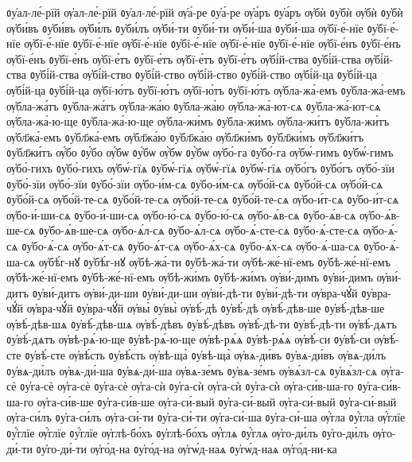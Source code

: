 {ᲂу҆ал-ле́-рїй
ѹ҆ал-ле́-рїй
ᲂу҆ал-ле́-рїй
ѹ҆а́-ре
ᲂу҆а́-ре
ѹ҆а́ръ
ᲂу҆а́ръ
ѹ҆бѝ
ᲂу҆бѝ
ѹ҆бѝ
ᲂу҆бѝ
ѹ҆би́въ
ᲂу҆би́въ
ѹ҆би́лъ
ᲂу҆би́лъ
ѹ҆би́-ти
ᲂу҆би́-ти
ѹ҆би́-ша
ᲂу҆би́-ша
ѹ҆бї-е́-нїе
ᲂу҆бї-е́-нїе
ѹ҆бї-е́-нїе
ᲂу҆бї-е́-нїе
ѹ҆бї-е́-нїе
ᲂу҆бї-е́-нїе
ѹ҆бї-е́-нїе
ᲂу҆бї-е́-нїе
ѹ҆бї-е́нъ
ᲂу҆бї-е́нъ
ѹ҆бї-е́нъ
ᲂу҆бї-е́нъ
ѹ҆бї-е́тъ
ᲂу҆бї-е́тъ
ѹ҆бї-е́тъ
ᲂу҆бї-е́тъ
ѹ҆бі́й-ства
ᲂу҆бі́й-ства
ѹ҆бі́й-ства
ᲂу҆бі́й-ства
ѹ҆бі́й-ство
ᲂу҆бі́й-ство
ѹ҆бі́й-ство
ᲂу҆бі́й-ство
ѹ҆бі́й-ца
ᲂу҆бі́й-ца
ѹ҆бі́й-ца
ᲂу҆бі́й-ца
ѹ҆бї-ю́тъ
ᲂу҆бї-ю́тъ
ѹ҆бї-ю́тъ
ᲂу҆бї-ю́тъ
ѹ҆бла-жа́-емъ
ᲂу҆бла-жа́-емъ
ѹ҆бла-жа́тъ
ᲂу҆бла-жа́тъ
ѹ҆бла-жа́ю
ᲂу҆бла-жа́ю
ѹ҆бла-жа́-ют-сѧ
ᲂу҆бла-жа́-ют-сѧ
ѹ҆бла-жа́-ю-ще
ᲂу҆бла-жа́-ю-ще
ѹ҆бла-жи́мъ
ᲂу҆бла-жи́мъ
ѹ҆бла-жи́тъ
ᲂу҆бла-жи́тъ
ѹ҆бл҃жа́-емъ
ᲂу҆бл҃жа́-емъ
ѹ҆бл҃жа́ю
ᲂу҆бл҃жа́ю
ѹ҆бл҃жи́мъ
ᲂу҆бл҃жи́мъ
ѹ҆бл҃жи́тъ
ᲂу҆бл҃жи́тъ
ѹ҆́бо
ᲂу҆́бо
ѹ҆́бѡ
ᲂу҆́бѡ
ѹ҆̀бѡ
ᲂу҆̀бѡ
ѹ҆бо́-га
ᲂу҆бо́-га
ѹ҆бѡ́-гимъ
ᲂу҆бѡ́-гимъ
ѹ҆бо́-гихъ
ᲂу҆бо́-гихъ
ѹ҆бѡ́-гїѧ
ᲂу҆бѡ́-гїѧ
ѹ҆бѡ́-гїѧ
ᲂу҆бѡ́-гїѧ
ѹ҆бо́гъ
ᲂу҆бо́гъ
ѹ҆бо́-зїи
ᲂу҆бо́-зїи
ѹ҆бо́-зїи
ᲂу҆бо́-зїи
ѹ҆бо-и́м-сѧ
ᲂу҆бо-и́м-сѧ
ѹ҆бо́й-сѧ
ᲂу҆бо́й-сѧ
ѹ҆бо́й-сѧ
ᲂу҆бо́й-сѧ
ѹ҆бо́й-те-сѧ
ᲂу҆бо́й-те-сѧ
ѹ҆бо́й-те-сѧ
ᲂу҆бо́й-те-сѧ
ѹ҆бо-и́т-сѧ
ᲂу҆бо-и́т-сѧ
ѹ҆бо-и́-ши-сѧ
ᲂу҆бо-и́-ши-сѧ
ѹ҆бо-ю́-сѧ
ᲂу҆бо-ю́-сѧ
ѹ҆бо-ѧ́в-сѧ
ᲂу҆бо-ѧ́в-сѧ
ѹ҆бо-ѧ́в-ше-сѧ
ᲂу҆бо-ѧ́в-ше-сѧ
ѹ҆бо-ѧ́л-сѧ
ᲂу҆бо-ѧ́л-сѧ
ѹ҆бо-ѧ́-сте-сѧ
ᲂу҆бо-ѧ́-сте-сѧ
ѹ҆бо-ѧ́-сѧ
ᲂу҆бо-ѧ́-сѧ
ѹ҆бо-ѧ́т-сѧ
ᲂу҆бо-ѧ́т-сѧ
ѹ҆бо-ѧ́х-сѧ
ᲂу҆бо-ѧ́х-сѧ
ѹ҆бо-ѧ́-ша-сѧ
ᲂу҆бо-ѧ́-ша-сѧ
ѹ҆бѣ́г-нꙋ
ᲂу҆бѣ́г-нꙋ
ѹ҆бѣ-жа́-ти
ᲂу҆бѣ-жа́-ти
ѹ҆бѣ-же́-нї-емъ
ᲂу҆бѣ-же́-нї-емъ
ѹ҆бѣ-же́-нї-емъ
ᲂу҆бѣ-же́-нї-емъ
ѹ҆бѣ-жи́мъ
ᲂу҆бѣ-жи́мъ
ѹ҆ви́-димъ
ᲂу҆ви́-димъ
ѹ҆ви́-дитъ
ᲂу҆ви́-дитъ
ѹ҆ви́-ди-ши
ᲂу҆ви́-ди-ши
ѹ҆ви́-дѣ-ти
ᲂу҆ви́-дѣ-ти
ѹ҆вра-чꙋ́й
ᲂу҆вра-чꙋ́й
ѹ҆вра-чꙋ́й
ᲂу҆вра-чꙋ́й
ѹ҆вы̀
ᲂу҆вы̀
ѹ҆вѣ́-дѣ
ᲂу҆вѣ́-дѣ
ѹ҆вѣ́-дѣв-ше
ᲂу҆вѣ́-дѣв-ше
ѹ҆вѣ́-дѣв-шѧ
ᲂу҆вѣ́-дѣв-шѧ
ѹ҆вѣ́-дѣвъ
ᲂу҆вѣ́-дѣвъ
ѹ҆вѣ́-дѣ-ти
ᲂу҆вѣ́-дѣ-ти
ѹ҆вѣ́-дѧтъ
ᲂу҆вѣ́-дѧтъ
ѹ҆вѣ-рѧ́-ю-ще
ᲂу҆вѣ-рѧ́-ю-ще
ѹ҆вѣ-рѧ́ѧ
ᲂу҆вѣ-рѧ́ѧ
ѹ҆вѣ́-си
ᲂу҆вѣ́-си
ѹ҆вѣ́-сте
ᲂу҆вѣ́-сте
ѹ҆вѣ́сть
ᲂу҆вѣ́сть
ѹ҆вѣ-ща̀
ᲂу҆вѣ-ща̀
ѹ҆вѧ-ди́въ
ᲂу҆вѧ-ди́въ
ѹ҆вѧ-ди́лъ
ᲂу҆вѧ-ди́лъ
ѹ҆вѧ-ди́-ша
ᲂу҆вѧ-ди́-ша
ѹ҆вѧ-зе́мъ
ᲂу҆вѧ-зе́мъ
ѹ҆вѧ́зл-сѧ
ᲂу҆вѧ́зл-сѧ
ѹ҆га-сѐ
ᲂу҆га-сѐ
ѹ҆га-сѐ
ᲂу҆га-сѐ
ѹ҆га-сѝ
ᲂу҆га-сѝ
ѹ҆га-сѝ
ᲂу҆га-сѝ
ѹ҆га-си́в-ша-го
ᲂу҆га-си́в-ша-го
ѹ҆га-си́в-ше
ᲂу҆га-си́в-ше
ѹ҆га-си́-вый
ᲂу҆га-си́-вый
ѹ҆га-си́-вый
ᲂу҆га-си́-вый
ѹ҆га-си́лъ
ᲂу҆га-си́лъ
ѹ҆га-си́-ти
ᲂу҆га-си́-ти
ѹ҆га-си́-ша
ᲂу҆га-си́-ша
ѹ҆́гла
ᲂу҆́гла
ѹ҆́глїе
ᲂу҆́глїе
ѹ҆́глїе
ᲂу҆́глїе
ѹ҆глѣ-бо́хъ
ᲂу҆глѣ-бо́хъ
ѹ҆́глѧ
ᲂу҆́глѧ
ѹ҆го-ди́лъ
ᲂу҆го-ди́лъ
ѹ҆го-ди́-ти
ᲂу҆го-ди́-ти
ѹ҆го́д-на
ᲂу҆го́д-на
ѹ҆гѡ́д-наѧ
ᲂу҆гѡ́д-наѧ
ѹ҆го́д-ни-ка
}
